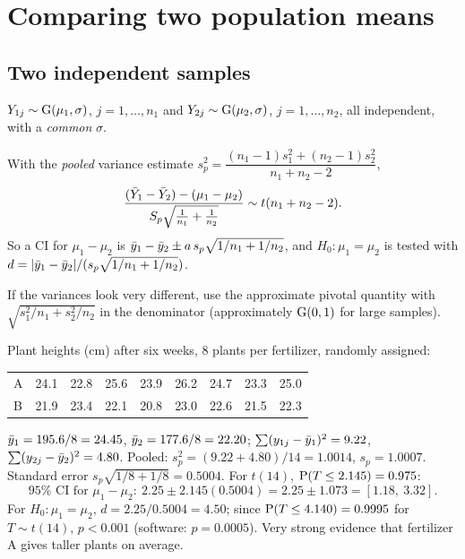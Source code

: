 \section{Comparing two population means}

\subsection{Two independent samples}

\begin{definition}
$Y_{1j}\sim\operatorname{G}(\mu_1,\sigma)$, $j=1,\dots,n_1$ and $Y_{2j}\sim\operatorname{G}(\mu_2,\sigma)$,
$j=1,\dots,n_2$, all independent, with a \emph{common} $\sigma$.
\end{definition}

\begin{theorem}
With the \emph{pooled} variance estimate
$s_p^2 = \dfrac{(n_1-1)s_1^2 + (n_2-1)s_2^2}{n_1+n_2-2}$,
\[
\frac{(\bar{Y}_1-\bar{Y}_2) - (\mu_1-\mu_2)}{S_p\sqrt{\frac1{n_1}+\frac1{n_2}}}\sim t(n_1+n_2-2).
\]
So a CI for $\mu_1-\mu_2$ is $\bar{y}_1-\bar{y}_2\pm a\,s_p\sqrt{1/n_1+1/n_2}$, and
$H_0:\mu_1=\mu_2$ is tested with $d = |\bar{y}_1-\bar{y}_2|/(s_p\sqrt{1/n_1+1/n_2})$.
\end{theorem}

If the variances look very different, use the approximate pivotal quantity with
$\sqrt{s_1^2/n_1 + s_2^2/n_2}$ in the denominator (approximately $\operatorname{G}(0,1)$ for large
samples).

\begin{example}
Plant heights (cm) after six weeks, $8$ plants per fertilizer, randomly assigned:
\begin{center}
\begin{tabular}{l*{8}{c}}
\toprule
A & 24.1 & 22.8 & 25.6 & 23.9 & 26.2 & 24.7 & 23.3 & 25.0\\
B & 21.9 & 23.4 & 22.1 & 20.8 & 23.0 & 22.6 & 21.5 & 22.3\\
\bottomrule
\end{tabular}
\end{center}
$\bar{y}_1 = 195.6/8 = 24.45$, $\bar{y}_2 = 177.6/8 = 22.20$; $\sum(y_{1j}-\bar{y}_1)^2 = 9.22$,
$\sum(y_{2j}-\bar{y}_2)^2 = 4.80$. Pooled: $s_p^2 = (9.22+4.80)/14 = 1.0014$, $s_p = 1.0007$.
Standard error $s_p\sqrt{1/8+1/8} = 0.5004$. For $t(14)$, $\operatorname{P}(T\le 2.145) = 0.975$:
\[
95\%\text{ CI for }\mu_1-\mu_2:\ 2.25\pm 2.145(0.5004) = 2.25\pm1.073 = [1.18,\ 3.32].
\]
For $H_0:\mu_1=\mu_2$, $d = 2.25/0.5004 = 4.50$; since $\operatorname{P}(T\le 4.140) = 0.9995$ for
$T\sim t(14)$, $p<0.001$ (software: $p = 0.0005$). Very strong evidence that fertilizer A
gives taller plants on average.
\end{example}

